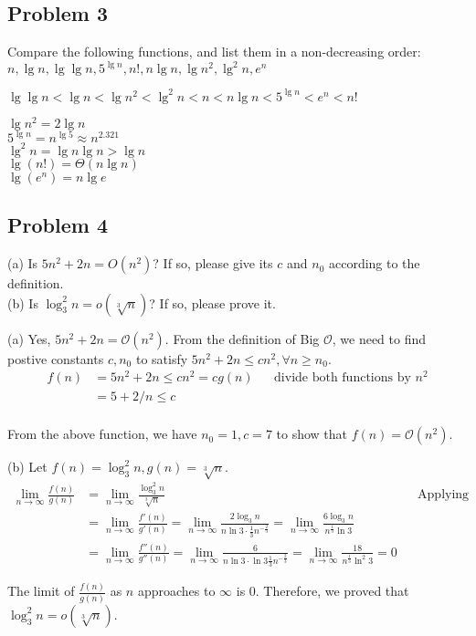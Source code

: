 \documentclass[a4paper]{article}
\makeatletter
\newenvironment{solution}
  {\begin{proof}[Solution]}
  {\end{proof}}
\renewenvironment{proof}[1][\proofname]{%
  \par\pushQED{\qed}\normalfont%
  \topsep6\p@\@plus6\p@\relax
  \trivlist\item[\hskip\labelsep\bfseries#1\@addpunct{.}]%
  \ignorespaces
}{%
  \popQED\endtrivlist\@endpefalse
}
\makeatother
\begin{document}
\subsection*{Problem 3}
Compare the following functions, and list them in a non-decreasing order: \\
$n, \lg n, \lg \lg n, 5^{\lg n}, n!, n \lg n, \lg n^2, \lg^2 n, e^n$
\begin{solution}
  $\lg\lg n < \lg n < \lg n^2 < \lg^2 n< n < n \lg n < 5^{\lg n} < e^n < n!$

 $\lg n^2 = 2\lg n$ \\
 $5^{\lg n} = n^{\lg 5} \approx n^{2.321}$ \\
 $\lg^2 n = \lg n \lg n > \lg n$ \\
 $\lg(n!) = \Theta(n \lg n)$ \\
 $\lg(e^n) = n \lg e$
\end{solution}

\subsection*{Problem 4}
(a) Is $5n^2+2n =O(n^2)$? If so, please give its $c$ and $n_0$ according to the definition. \\
(b) Is $\log_3^2 n =o(\sqrt[3]n)$? If so, please prove it.
\begin{solution}
  (a) Yes, $5n^2 + 2n = \mathcal{O}(n^2)$. From the definition of Big $\mathcal{O}$, we need to find postive constants $c, n_0$ to satisfy $5n^2 + 2n \le cn^2, \forall n \ge n_0$.
  \begin{align*}
    f(n) &= 5n^2 + 2n \le cn^ 2 = cg(n) && \text{divide both functions by $n^2$}\\
        &= 5 + 2/n \le c \\
  \end{align*}

  From the above function, we have $n_0 = 1, c = 7$ to show that $f(n) = \mathcal{O}(n^2)$.
\end{solution}

\begin{solution}
  (b) Let $f(n) = \log_3^2 n, g(n) = \sqrt[3]{n}$.
  \begin{align*}
    \lim\limits_{n \to \infty}\frac{f(n)}{g(n)} &= \lim\limits_{n \to \infty}\frac{\log_3^2 n}{\sqrt[3]n} && \text{Applying L'Hospital's Rule} \\
                                                &= \lim\limits_{n \to \infty}\frac{f'(n)}{g'(n)} =  \lim\limits_{n \to \infty}\frac{2\log_3 n}{n \ln 3 \cdot \frac{1}{3} n^{-\frac{2}{3}}} = \lim\limits_{n \to \infty}\frac{6 \log_3 n}{n^{\frac{1}{3}} \ln 3}\\
                                                &= \lim\limits_{n \to \infty}\frac{f''(n)}{g''(n)} =\lim\limits_{n \to \infty}\frac{6}{n \ln 3 \cdot \ln 3 \frac{1}{3} n^{-\frac{2}{3}}} = \lim\limits_{n \to \infty}\frac{18}{n^{\frac{1}{3}} \ln^2 3} = 0
  \end{align*}

  The limit of $\frac{f(n)}{g(n)}$ as $n$ approaches to $\infty$ is $0$. Therefore, we proved that $\log_3^2 n = o(\sqrt[3]{n})$.
\end{solution}
\end{document}
